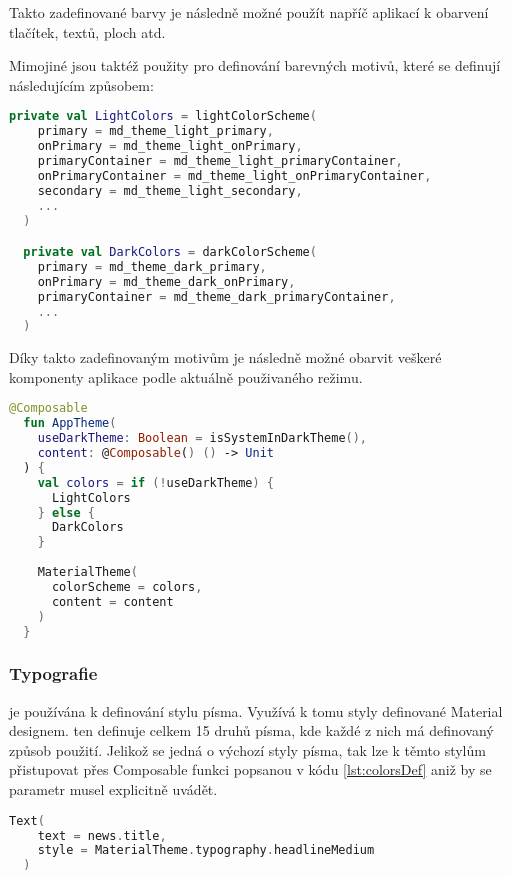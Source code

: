 Takto zadefinované barvy je následně možné použít napříč aplikací k obarvení tlačítek, textů, ploch atd.

Mimojiné jsou taktéž použity pro definování barevných motivů, které se definují následujícím způsobem:

\begin{lstlisting}[caption={Definice barevných motivů}, label={lst:ComposeCode}, language=Kotlin]
  private val LightColors = lightColorScheme(
    primary = md_theme_light_primary,
    onPrimary = md_theme_light_onPrimary,
    primaryContainer = md_theme_light_primaryContainer,
    onPrimaryContainer = md_theme_light_onPrimaryContainer,
    secondary = md_theme_light_secondary,
    ...
  )

  private val DarkColors = darkColorScheme(
    primary = md_theme_dark_primary,
    onPrimary = md_theme_dark_onPrimary,
    primaryContainer = md_theme_dark_primaryContainer,
    ...
  )
\end{lstlisting}

Díky takto zadefinovaným motivům je následně možné obarvit veškeré komponenty aplikace podle aktuálně použivaného režimu.

\begin{lstlisting}[caption={Definice barevných motivů}, label={lst:colorsDef}, language=Kotlin]
  @Composable
  fun AppTheme(
    useDarkTheme: Boolean = isSystemInDarkTheme(),
    content: @Composable() () -> Unit
  ) {
    val colors = if (!useDarkTheme) {
      LightColors
    } else {
      DarkColors
    }
  
    MaterialTheme(
      colorScheme = colors,
      content = content
    )
  }
\end{lstlisting}

\subsubsection*{Typografie}
je používána k definování stylu písma. Využívá k tomu styly definované Material designem. ten definuje celkem 15 druhů písma,
kde každé z nich má definovaný způsob použití. \cite{material3} Jelikož se jedná o výchozí styly písma, tak lze k těmto stylům přistupovat přes
Composable funkci  popsanou v kódu \ref{lst:colorsDef} aniž by se parametr  musel explicitně
uvádět.

\begin{lstlisting}[caption={Ukázka použití stylu písma}, label={lst:typographyExample}, language=Kotlin]
  Text(
    text = news.title,
    style = MaterialTheme.typography.headlineMedium
  )
\end{lstlisting}



